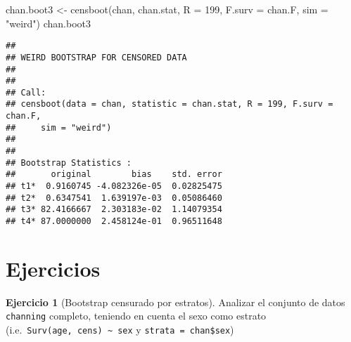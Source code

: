\documentclass[
]{book}
\newenvironment{Shaded}{\begin{snugshade}}{\end{snugshade}}
\newcommand{\AttributeTok}[1]{\textcolor[rgb]{0.77,0.63,0.00}{#1}}
\newcommand{\CommentTok}[1]{\textcolor[rgb]{0.56,0.35,0.01}{\textit{#1}}}
\newcommand{\DecValTok}[1]{\textcolor[rgb]{0.00,0.00,0.81}{#1}}
\newcommand{\FunctionTok}[1]{\textcolor[rgb]{0.00,0.00,0.00}{#1}}
\newcommand{\NormalTok}[1]{#1}
\newcommand{\OtherTok}[1]{\textcolor[rgb]{0.56,0.35,0.01}{#1}}
\newcommand{\SpecialCharTok}[1]{\textcolor[rgb]{0.00,0.00,0.00}{#1}}
\newcommand{\StringTok}[1]{\textcolor[rgb]{0.31,0.60,0.02}{#1}}
\theoremstyle{break}
\theoremstyle{definition}
\theoremstyle{definition}
\theoremstyle{definition}
\newtheorem{exercise}{Ejercicio}[chapter]
\theoremstyle{definition}
\theoremstyle{remark}
\begin{document}
\begin{Shaded}
\begin{Highlighting}[]
\NormalTok{chan.boot3 }\OtherTok{\textless{}{-}} \FunctionTok{censboot}\NormalTok{(chan, chan.stat, }\AttributeTok{R =} \DecValTok{199}\NormalTok{, }\AttributeTok{F.surv =}\NormalTok{ chan.F, }
                  \AttributeTok{sim =} \StringTok{"weird"}\NormalTok{)}
\NormalTok{chan.boot3}
\end{Highlighting}
\end{Shaded}

\begin{verbatim}
## 
## WEIRD BOOTSTRAP FOR CENSORED DATA
## 
## 
## Call:
## censboot(data = chan, statistic = chan.stat, R = 199, F.surv = chan.F, 
##     sim = "weird")
## 
## 
## Bootstrap Statistics :
##       original        bias    std. error
## t1*  0.9160745 -4.082326e-05  0.02825475
## t2*  0.6347541  1.639197e-03  0.05086460
## t3* 82.4166667  2.303183e-02  1.14079354
## t4* 87.0000000  2.458124e-01  0.96511648
\end{verbatim}

\hypertarget{ejercicios}{%
\section{Ejercicios}\label{ejercicios}}

\begin{exercise}[Bootstrap censurado por estratos]
\protect\hypertarget{exr:censboot-strata-ej}{}{\label{exr:censboot-strata-ej} \iffalse (Bootstrap censurado por estratos) \fi{} }
Analizar el conjunto de datos \texttt{channing} completo, teniendo en cuenta el sexo como estrato
(i.e.~\texttt{Surv(age,\ cens)\ \textasciitilde{}\ sex} y \texttt{strata\ =\ chan\$sex})
\end{exercise}

\begin{Shaded}
\end{Shaded}
\end{document}
